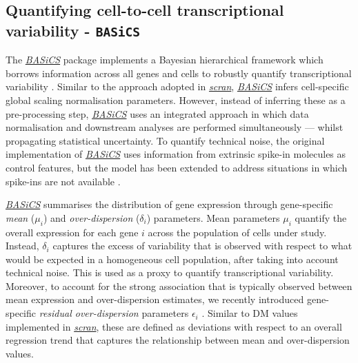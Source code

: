 \documentclass[9pt,a4paper,]{extarticle}
\begin{document}
\hypertarget{quantifying-cell-to-cell-transcriptional-variability---basics}{%
\subsection{\texorpdfstring{Quantifying cell-to-cell transcriptional variability - \texttt{BASiCS}}{Quantifying cell-to-cell transcriptional variability - BASiCS}}\label{quantifying-cell-to-cell-transcriptional-variability---basics}}

The \emph{\href{https://bioconductor.org/packages/3.11/BASiCS}{BASiCS}} package implements a Bayesian hierarchical framework
which borrows information across all genes and cells to robustly quantify
transcriptional variability \citep{Vallejos2015BASiCS}.
Similar to the approach adopted in \emph{\href{https://bioconductor.org/packages/3.11/scran}{scran}}, \emph{\href{https://bioconductor.org/packages/3.11/BASiCS}{BASiCS}}
infers cell-specific global scaling normalisation parameters.
However, instead of inferring these as a pre-processing step,
\emph{\href{https://bioconductor.org/packages/3.11/BASiCS}{BASiCS}} uses an integrated approach in which data normalisation
and downstream analyses are performed simultaneously --- whilst propagating
statistical uncertainty.
To quantify technical noise, the original implementation of
\emph{\href{https://bioconductor.org/packages/3.11/BASiCS}{BASiCS}} uses information from extrinsic spike-in molecules as
control features, but the model has been extended to address situations in which
spike-ins are not available \citep{Eling2018}.

\emph{\href{https://bioconductor.org/packages/3.11/BASiCS}{BASiCS}} summarises the distribution of gene expression through
gene-specific \emph{mean} (\(\mu_i\)) and \emph{over-dispersion} (\(\delta_i\)) parameters.
Mean parameters \(\mu_i\) quantify the overall expression for each gene \(i\)
across the population of cells under study.
Instead, \(\delta_i\) captures the excess of variability that is observed with
respect to what would be expected in a homogeneous cell population, after
taking into account technical noise.
This is used as a proxy to quantify transcriptional variability.
Moreover, to account for the strong association that is typically observed
between mean expression and over-dispersion estimates, we recently introduced
gene-specific \emph{residual over-dispersion} parameters \(\epsilon_i\) \citep{Eling2018}.
Similar to DM values implemented in \emph{\href{https://bioconductor.org/packages/3.11/scran}{scran}}, these are defined as
deviations with respect to an overall regression trend that captures the
relationship between mean and over-dispersion values.
\end{document}
